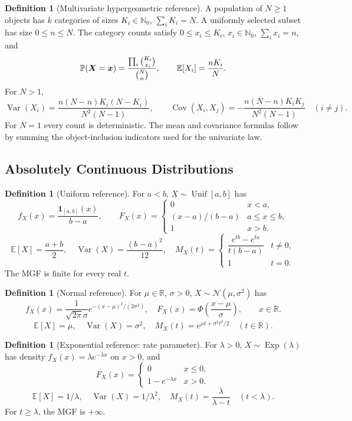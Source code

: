\documentclass[11pt]{article}
\numberwithin{equation}{section}
\theoremstyle{definition}
\newtheorem{definition}[theorem]{Definition}
\theoremstyle{remark}
\newcommand{\RR}{\mathbb R}
\newcommand{\NN}{\mathbb N}
\newcommand{\indicator}{\mathbf 1}
\newcommand{\Prob}{\mathbb P}
\newcommand{\Expt}{\mathbb E}
\DeclareMathOperator{\Var}{Var}
\DeclareMathOperator{\Cov}{Cov}
\newcommand{\Exponential}{\operatorname{Exp}}
\newcommand{\Uniform}{\operatorname{Unif}}
\newcommand{\Normal}{\mathcal N}
\begin{document}
\begin{definition}[Multivariate hypergeometric reference]\label{probability-definition-078}
A population of \(N\ge1\) objects has \(k\) categories of sizes
\(K_i\in\NN_0\), \(\sum_iK_i=N\). A uniformly selected subset has size
\(0\le n\le N\). The category counts satisfy
\(0\le x_i\le K_i\), \(x_i\in\NN_0\), \(\sum_i x_i=n\), and
\[\Prob(\vb X=\vb x)=\frac{\prod_i\binom{K_i}{x_i}}{\binom Nn},\qquad
\Expt[X_i]=\frac{nK_i}{N}.\]
For \(N>1\),
\[\Var(X_i)=\frac{n(N-n)K_i(N-K_i)}{N^2(N-1)},\qquad
\Cov(X_i,X_j)=-\frac{n(N-n)K_iK_j}{N^2(N-1)}\quad(i\ne j).\]
For \(N=1\) every count is deterministic. The mean and covariance formulas
follow by summing the object-inclusion indicators used for the univariate law.
\end{definition}

\subsection{Absolutely Continuous Distributions}\label{probability-tab:summary-continuous-distribution}
\begin{definition}[Uniform reference]\label{probability-definition-079}
For \(a<b\), \(X\sim\Uniform[a,b]\) has
\[f_X(x)=\frac{\indicator_{[a,b]}(x)}{b-a},\qquad
F_X(x)=\begin{cases}0&x<a,\\(x-a)/(b-a)&a\le x\le b,\\1&x>b.\end{cases}\]
\[\Expt[X]=\frac{a+b}{2},\quad \Var(X)=\frac{(b-a)^2}{12},\quad
M_X(t)=\begin{cases}\dfrac{e^{tb}-e^{ta}}{t(b-a)}&t\ne0,\\1&t=0.\end{cases}\]
The MGF is finite for every real \(t\).
\end{definition}

\begin{definition}[Normal reference]\label{probability-definition-080}
For \(\mu\in\RR\), \(\sigma>0\), \(X\sim\Normal(\mu,\sigma^2)\) has
\[f_X(x)=\frac1{\sqrt{2\pi}\sigma}e^{-(x-\mu)^2/(2\sigma^2)},\quad
F_X(x)=\Phi\left(\frac{x-\mu}{\sigma}\right),\qquad x\in\RR.\]
\[\Expt[X]=\mu,\quad\Var(X)=\sigma^2,\quad
M_X(t)=e^{\mu t+\sigma^2t^2/2}\quad(t\in\RR).\]
\end{definition}

\begin{definition}[Exponential reference: rate parameter]\label{probability-definition-081}
For \(\lambda>0\), \(X\sim\Exponential(\lambda)\) has density
\(f_X(x)=\lambda e^{-\lambda x}\) on \(x>0\), and
\[F_X(x)=\begin{cases}0&x\le0,\\1-e^{-\lambda x}&x>0.\end{cases}\]
\[\Expt[X]=1/\lambda,\quad\Var(X)=1/\lambda^2,\quad
M_X(t)=\frac{\lambda}{\lambda-t}\quad(t<\lambda).\]
For \(t\ge\lambda\), the MGF is \(+\infty\).
\end{definition}
\end{document}
